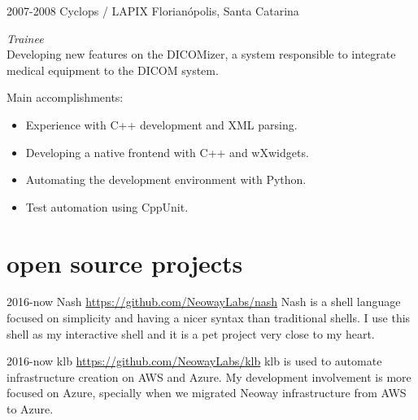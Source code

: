 \documentclass[]{friggeri-cv} %
\begin{document}
\begin{entrylist}
\entry
{2007-2008}
{Cyclops / LAPIX}
{Florianópolis, Santa Catarina}
{\emph{Trainee} \\

Developing new features on the DICOMizer, a system responsible to integrate medical equipment to the DICOM system.

Main accomplishments:\\

\begin{itemize}
\item Experience with C++ development and XML parsing.
\item Developing a native frontend with C++ and wXwidgets.
\item Automating the development environment with Python.
\item Test automation using CppUnit.
\end{itemize}
}
\end{entrylist}


\pagebreak
\section{open source projects}

\begin{entrylist}
\entry
{2016-now}
{Nash}
{\href{https://github.com/NeowayLabs/nash}{https://github.com/NeowayLabs/nash}}
{
Nash is a shell language focused on simplicity and having a nicer syntax
than traditional shells. I use this shell as my interactive shell and it is
a pet project very close to my heart.
}
\end{entrylist}

\begin{entrylist}
\entry
{2016-now}
{klb}
{\href{https://github.com/NeowayLabs/klb}{https://github.com/NeowayLabs/klb}}
{
    klb is used to automate infrastructure creation on AWS and Azure.
    My development involvement is more focused on Azure, specially when
    we migrated Neoway infrastructure from AWS to Azure.
}
\end{entrylist}
\end{document}
